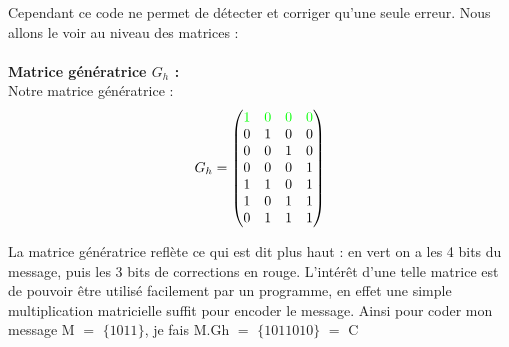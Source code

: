 Cependant ce code ne permet de détecter et corriger qu'une seule erreur. Nous allons le voir au niveau des matrices :
\\
\\ \textbf{Matrice génératrice $G_h$ :}
\\
Notre matrice génératrice :\\
\begin{align*}
  G_h =
  \left(
    \begin{matrix}
      \textcolor{green}{1} & \textcolor{green}{0} & \textcolor{green}{0} & \textcolor{green}{0} \\
      0 & 1 & 0 & 0 \\
      0 & 0 & 1 & 0 \\
      0 & 0 & 0 & 1 \\
      1 & 1 & 0 & 1 \\
      1 & 0 & 1 & 1 \\
      0 & 1 & 1 & 1
    \end{matrix}
  \right)
\end{align*}

La matrice génératrice reflète ce qui est dit plus haut : en vert on a les 4 bits du message, puis les 3 bits de corrections en rouge. L'intérêt d’une telle matrice est de pouvoir être utilisé facilement par un programme, en effet une simple multiplication matricielle suffit pour encoder le message.
Ainsi pour coder mon message M $=$ $\{1011\}$, je fais M.Gh $=$ $\{1011010\}$ $=$ C
\\ \\


